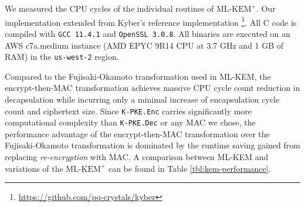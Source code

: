 \documentclass[runningheads]{llncs}
\newcommand{\encrypt}{\texttt{Enc}}
\newcommand{\decrypt}{\texttt{Dec}}
\def\mlkemplus{\text{ML-KEM}^+}
\begin{document}
We measured the CPU cycles of the individual routines of $\mlkemplus$. Our implementation extended from Kyber's reference implementation \footnote{\url{https://github.com/pq-crystals/kyber}}. All C code is compiled with \texttt{GCC 11.4.1} and \texttt{OpenSSL 3.0.8}. All binaries are executed on an AWS c7a.medium instance (AMD EPYC 9R14 CPU at 3.7 GHz and 1 GB of RAM) in the \texttt{us-west-2} region.

Compared to the Fujisaki-Okamoto transformation used in ML-KEM, the encrypt-then-MAC transformation achieves massive CPU cycle count reduction in decapsulation while incurring only a minimal increase of encapsulation cycle count and ciphertext size. Since \texttt{K-PKE.\encrypt} carries significantly more computational complexity than \texttt{K-PKE.\decrypt} or any MAC we chose, the performance advantage of the encrypt-then-MAC transformation over the Fujisaki-Okamoto transformation is dominated by the runtime saving gained from replacing \emph{re-encryption} with MAC. A comparison between ML-KEM and variations of the $\mlkemplus$ can be found in Table \ref{tbl:kem-performance}.
\end{document}
